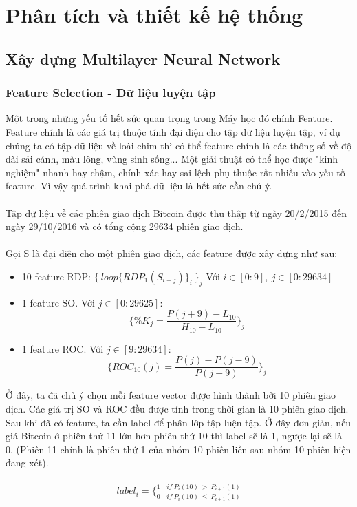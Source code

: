 \chapter{Phân tích và thiết kế hệ thống}

\section{Xây dựng Multilayer Neural Network}
\subsection{Feature Selection - Dữ liệu luyện tập}
Một trong những yếu tố hết sức quan trọng trong Máy học đó chính Feature. 
Feature chính là các giá trị thuộc tính đại diện cho tập dữ liệu luyện tập, ví dụ 
chúng ta có tập dữ liệu về loài chim thì có thể feature chính là các thông số 
về độ dài sải cánh, màu lông, vùng sinh sống... Một giải thuật có thể học được 
"kinh nghiệm" nhanh hay chậm, chính xác hay sai lệch phụ thuộc rất nhiều vào yếu 
tố feature. Vì vậy quá trình khai phá dữ liệu là hết sức cần chú ý.\\\\
Tập dữ liệu về các phiên giao dịch Bitcoin được thu thập từ ngày 20/2/2015 đến 
ngày 29/10/2016 và có tổng cộng 29634 phiên giao dịch.\\\\
Gọi S là đại diện cho một phiên giao dịch, các feature được xây dựng như sau:
\begin{itemize}
    \item 10 feature RDP: $\{ \: loop\{ RDP_1(S_{i+j})\}_i \: \}_j$ Với 
    $i \in [0:9], \: j \in [0:29634]$
    \item 1 feature SO. Với $ j \in [0:29625] $:\\
    \[
        \{ \%K_j = \frac{P(j+9)-L_{10}}{H_{10}-L_{10}} \}_j
    \]
    \item 1 feature ROC. Với $ j \in [9:29634] $:\\ 
    \[
        \{ ROC_{10}(j)= \frac{P(j) - P(j-9)}{P(j-9)} \}_j
    \]
\end{itemize}
Ở đây, ta đã chủ ý chọn mỗi feature vector được hình thành bởi 10 phiên giao 
dịch. Các giá trị SO và ROC đều được tính trong thời gian là 10 phiên giao dịch.
Sau khi đã có feature, ta cần label để phân lớp tập luện tập. Ở đây đơn giản, 
nếu giá Bitcoin ở phiên thứ 11 lớn hơn phiên thứ 10 thì label sẽ là 1, ngược
lại sẽ là 0. (Phiên 11 chính là phiên thứ 1 của nhóm 10 phiên liền sau nhóm 
10 phiên hiện đang xét).\\\\
\[
    label_i = \bigg \{ _{0 \quad if \: P_i(10) \: \leq \: P_{i+1}(1)} ^{1 \quad if \: P_i(10) \: > \: P_{i+1}(1)}
\]
